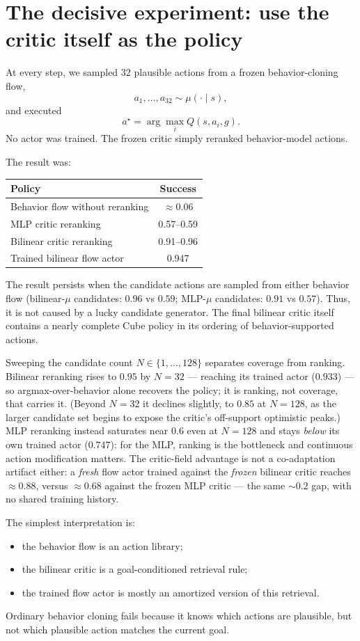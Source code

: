 \documentclass[12pt]{article}
\begin{document}
\section*{The decisive experiment: use the critic itself as the policy}
At every step, we sampled 32 plausible actions from a frozen behavior-cloning flow,
$$ a_1,\ldots,a_{32} \sim \mu(\cdot\mid s), $$
and executed
$$ a^\star = \arg\max_i Q(s,a_i,g). $$
No actor was trained. The frozen critic simply reranked behavior-model actions.

The result was:
\begin{table}[h]
\centering
\begin{tabular}{lc}
\toprule
\textbf{Policy} & \textbf{Success}\\
\midrule
Behavior flow without reranking & $\approx 0.06$\\
MLP critic reranking & 0.57--0.59\\
Bilinear critic reranking & 0.91--0.96\\
Trained bilinear flow actor & 0.947\\
\bottomrule
\end{tabular}
\end{table}

The result persists when the candidate actions are sampled from either behavior flow (bilinear-$\mu$ candidates: $0.96$ vs $0.59$; MLP-$\mu$ candidates: $0.91$ vs $0.57$). Thus, it is not caused by a lucky candidate generator. The final bilinear critic itself contains a nearly complete Cube policy in its ordering of behavior-supported actions.

Sweeping the candidate count $N\in\{1,\ldots,128\}$ separates coverage from ranking. Bilinear reranking rises to $0.95$ by $N=32$ --- reaching its trained actor ($0.933$) --- so argmax-over-behavior alone recovers the policy; it is ranking, not coverage, that carries it. (Beyond $N=32$ it declines slightly, to $0.85$ at $N=128$, as the larger candidate set begins to expose the critic's off-support optimistic peaks.) MLP reranking instead saturates near $0.6$ even at $N=128$ and stays \emph{below} its own trained actor ($0.747$): for the MLP, ranking is the bottleneck and continuous action modification matters. The critic-field advantage is not a co-adaptation artifact either: a \emph{fresh} flow actor trained against the \emph{frozen} bilinear critic reaches $\approx 0.88$, versus $\approx 0.68$ against the frozen MLP critic --- the same $\sim\!0.2$ gap, with no shared training history.

The simplest interpretation is:
\begin{itemize}
    \item the behavior flow is an action library;
    \item the bilinear critic is a goal-conditioned retrieval rule;
    \item the trained flow actor is mostly an amortized version of this retrieval.
\end{itemize}
Ordinary behavior cloning fails because it knows which actions are plausible, but not which plausible action matches the current goal.
\end{document}
